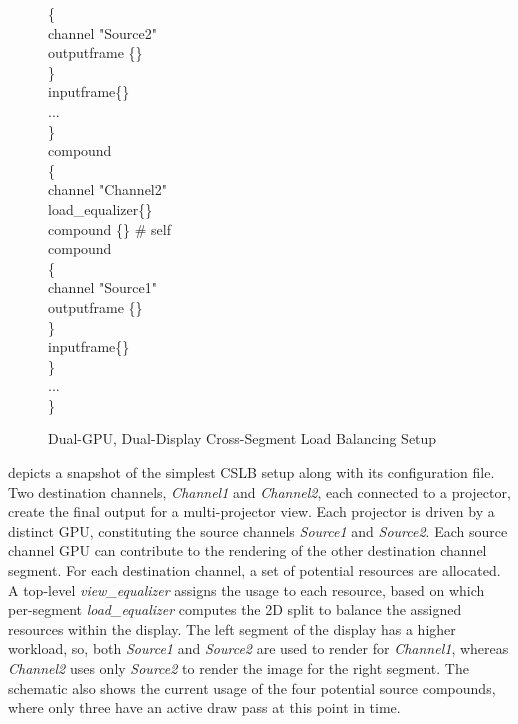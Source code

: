 \begin{figure}[h!t]
{\begin{minipage}[b]{0.46\textwidth}
{\quad \quad \{ \\
\quad \quad \quad channel "Source2" \\
\quad \quad \quad outputframe \{\} \\
\quad \quad \} \\
\quad \quad inputframe\{\} \\
\quad \quad ... \\
\quad \} \\
\quad compound \\
\quad \{ \\
\quad \quad channel "Channel2" \\
\quad \quad load\_equalizer\{\} \\
\quad \quad compound \{\} \# self \\
\quad \quad compound \\
\quad \quad \{  \\
\quad \quad \quad channel "Source1"  \\
\quad \quad \quad outputframe \{\}  \\
\quad \quad \} \\
\quad \quad inputframe\{\} \\
\quad \} \\
\quad ... \\
\} \\
	\label{fViewEqualizerConfig}}
	\end{minipage}
   }
\caption{Dual-GPU, Dual-Display Cross-Segment Load Balancing Setup}
\label{fViewEqualizer}
\end{figure}

 depicts a snapshot of the simplest CSLB setup along with
its configuration file. Two destination channels, {\em Channel1} and {\em
Channel2}, each connected to a projector, create the final output for a
multi-projector view. Each projector is driven by a distinct GPU, constituting
the source channels {\em Source1} and {\em Source2}. Each source channel GPU
can contribute to the rendering of the other destination channel segment. For
each destination channel, a set of potential resources are allocated. A
top-level {\em view\_equalizer} assigns the usage to each resource, based on
which per-segment {\em load\_equalizer} computes the 2D split to balance the
assigned resources within the display. The left segment of the display has a
higher workload, so, both {\em Source1} and {\em Source2} are used to render
for {\em Channel1}, whereas {\em Channel2} uses only {\em Source2} to render
the image for the right segment. The schematic also shows the current usage of
the four potential source compounds, where only three have an active draw pass
at this point in time.

